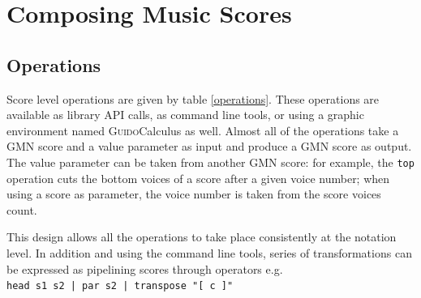 \documentclass[twoside,10pt,a4paper]{article}
\newcommand{\Guido}	{\textsc{Guido}}
\newcommand{\code}[1]	{{\small \texttt{#1}}}
\begin{document}
\section{Composing Music Scores}

\subsection{Operations}
Score level operations are given by table \ref{operations}. These operations are available as library API calls, as command line tools, or using a graphic environment named \Guido Calculus as well. Almost all of the operations take a GMN score and a value parameter as input and produce a GMN score as output. The value parameter can be taken from another GMN score:
for example, the \code{top} operation cuts the bottom voices of a score after a given voice number; when using a score as parameter, the voice number is taken from the score voices count.

This design allows all the operations to take place consistently at the notation level. In addition and using the command line tools, series of transformations can be expressed as pipelining scores through operators e.g. \\
\hspace*{4mm} \code{head s1 s2 | par s2 | transpose "[ c ]" }
\end{document}
